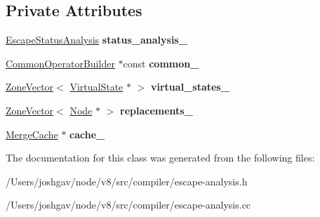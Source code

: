 \subsection*{Private Attributes}
\begin{DoxyCompactItemize}
\item 
\hyperlink{classv8_1_1internal_1_1compiler_1_1_escape_status_analysis}{Escape\+Status\+Analysis} {\bfseries status\+\_\+analysis\+\_\+}\hypertarget{classv8_1_1internal_1_1compiler_1_1_escape_analysis_aaaff20963d48b3013c167addb77f6ca5}{}\label{classv8_1_1internal_1_1compiler_1_1_escape_analysis_aaaff20963d48b3013c167addb77f6ca5}

\item 
\hyperlink{classv8_1_1internal_1_1compiler_1_1_common_operator_builder}{Common\+Operator\+Builder} $\ast$const {\bfseries common\+\_\+}\hypertarget{classv8_1_1internal_1_1compiler_1_1_escape_analysis_a73c38c72b2b1697f3b089631d0012623}{}\label{classv8_1_1internal_1_1compiler_1_1_escape_analysis_a73c38c72b2b1697f3b089631d0012623}

\item 
\hyperlink{classv8_1_1internal_1_1_zone_vector}{Zone\+Vector}$<$ \hyperlink{classv8_1_1internal_1_1compiler_1_1_virtual_state}{Virtual\+State} $\ast$ $>$ {\bfseries virtual\+\_\+states\+\_\+}\hypertarget{classv8_1_1internal_1_1compiler_1_1_escape_analysis_a6ec9bc491750bed74f9718aa6aa113cd}{}\label{classv8_1_1internal_1_1compiler_1_1_escape_analysis_a6ec9bc491750bed74f9718aa6aa113cd}

\item 
\hyperlink{classv8_1_1internal_1_1_zone_vector}{Zone\+Vector}$<$ \hyperlink{classv8_1_1internal_1_1compiler_1_1_node}{Node} $\ast$ $>$ {\bfseries replacements\+\_\+}\hypertarget{classv8_1_1internal_1_1compiler_1_1_escape_analysis_a5e5a83d09600f0e4a0e93aa5bec2db75}{}\label{classv8_1_1internal_1_1compiler_1_1_escape_analysis_a5e5a83d09600f0e4a0e93aa5bec2db75}

\item 
\hyperlink{classv8_1_1internal_1_1compiler_1_1_merge_cache}{Merge\+Cache} $\ast$ {\bfseries cache\+\_\+}\hypertarget{classv8_1_1internal_1_1compiler_1_1_escape_analysis_a9e13cbe6e68b47e45ef06c67794b4465}{}\label{classv8_1_1internal_1_1compiler_1_1_escape_analysis_a9e13cbe6e68b47e45ef06c67794b4465}

\end{DoxyCompactItemize}


The documentation for this class was generated from the following files\+:\begin{DoxyCompactItemize}
\item 
/\+Users/joshgav/node/v8/src/compiler/escape-\/analysis.\+h\item 
/\+Users/joshgav/node/v8/src/compiler/escape-\/analysis.\+cc\end{DoxyCompactItemize}
